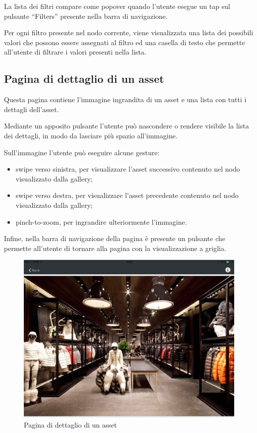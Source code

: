 La lista dei filtri compare come popover quando l'utente esegue un tap sul pulsante ``Filters'' presente nella barra di navigazione.

Per ogni filtro presente nel nodo corrente, viene visualizzata una lista dei possibili valori che possono essere assegnati al filtro ed una casella di testo che permette all'utente di filtrare i valori presenti nella lista.

\FloatBarrier
\subsection{Pagina di dettaglio di un asset}\label{sec:pag-dettaglio-asset}

Questa pagina contiene l'immagine ingrandita di un asset e una lista con tutti i dettagli dell'asset.

Mediante un apposito pulsante l'utente può nascondere o rendere visibile la lista dei dettagli, in modo da lasciare più spazio all'immagine.

Sull'immagine l'utente può eseguire alcune gesture:
\begin{itemize}
\item \gls{swipe} verso sinistra, per visualizzare l'asset successivo contenuto nel nodo visualizzato dalla gallery;
\item swipe verso destra, per visualizzare l'asset precedente contenuto nel nodo visualizzato dalla gallery;
\item pinch-to-zoom, per ingrandire ulteriormente l'immagine.
\end{itemize}

Infine, nella barra di navigazione della pagina è presente un pulsante che permette all'utente di tornare alla pagina con la visualizzazione a griglia.

\begin{figure}[htp]
\centering
\includegraphics[scale=0.25]{../immagini/warda-asset-no-dettaglio}
\caption{Pagina di dettaglio di un asset}
\end{figure}

